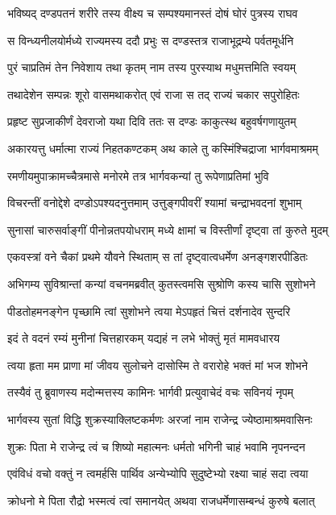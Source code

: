 \twolineshloka
{भविष्यद् दण्डपतनं शरीरे तस्य वीक्ष्य च}
{सम्पश्यमानस्तं दोषं घोरं पुत्रस्य राघव}%

\twolineshloka
{स विन्ध्यनीलयोर्मध्ये राज्यमस्य ददौ प्रभुः}
{स दण्डस्तत्र राजाभूद्रम्ये पर्वतमूर्धनि}%

\twolineshloka
{पुरं चाप्रतिमं तेन निवेशाय तथा कृतम्}
{नाम तस्य पुरस्याथ मधुमत्तमिति स्वयम्}%

\twolineshloka
{तथादेशेन सम्पन्नः शूरो वासमथाकरोत्}
{एवं राजा स तद् राज्यं चकार सपुरोहितः}%

\twolineshloka
{प्रहृष्ट सुप्रजाकीर्णं देवराजो यथा दिवि}
{ततः स दण्डः काकुत्स्थ बहुवर्षगणायुतम्}%

\twolineshloka
{अकारयत्तु धर्मात्मा राज्यं निहतकण्टकम्}
{अथ काले तु कस्मिंश्चिद्राजा भार्गवमाश्रमम्}%

\twolineshloka
{रमणीयमुपाक्रामच्चैत्रमासे मनोरमे}
{तत्र भार्गवकन्यां तु रूपेणाप्रतिमां भुवि}%

\twolineshloka
{विचरन्तीं वनोद्देशे दण्डोऽपश्यदनुत्तमाम्}
{उत्तुङ्गपीवरीं श्यामां चन्द्राभवदनां शुभाम्}%

\twolineshloka
{सुनासां चारुसर्वाङ्गीं पीनोन्नतपयोधराम्}
{मध्ये क्षामां च विस्तीर्णां दृष्ट्वा तां कुरुते मुदम्}%

\twolineshloka
{एकवस्त्रां वने चैकां प्रथमे यौवने स्थिताम्}
{स तां दृष्ट्वात्वधर्मेण अनङ्गशरपीडितः}%

\twolineshloka
{अभिगम्य सुविश्रान्तां कन्यां वचनमब्रवीत्}
{कुतस्त्वमसि सुश्रोणि कस्य चासि सुशोभने}%

\twolineshloka
{पीडतोहमनङ्गेन पृच्छामि त्वां सुशोभने}
{त्वया मेऽपहृतं चित्तं दर्शनादेव सुन्दरि}%

\twolineshloka
{इदं ते वदनं रम्यं मुनीनां चित्तहारकम्}
{यद्यहं न लभे भोक्तुं मृतं मामवधारय}%

\twolineshloka
{त्वया हृता मम प्राणा मां जीवय सुलोचने}
{दासोस्मि ते वरारोहे भक्तं मां भज शोभने}%

\twolineshloka
{तस्यैवं तु ब्रुवाणस्य मदोन्मत्तस्य कामिनः}
{भार्गवी प्रत्युवाचेदं वचः सविनयं नृपम्}%

\twolineshloka
{भार्गवस्य सुतां विद्धि शुक्रस्याक्लिष्टकर्मणः}
{अरजां नाम राजेन्द्र ज्येष्ठामाश्रमवासिनः}%

\twolineshloka
{शुक्रः पिता मे राजेन्द्र त्वं च शिष्यो महात्मनः}
{धर्मतो भगिनी चाहं भवामि नृपनन्दन}%

\twolineshloka
{एवंविधं वचो वक्तुं न त्वमर्हसि पार्थिव}
{अन्येभ्योपि सुदुष्टेभ्यो रक्ष्या चाहं सदा त्वया}%

\twolineshloka
{क्रोधनो मे पिता रौद्रो भस्मत्वं त्वां समानयेत्}
{अथवा राजधर्मेणासम्बन्धं कुरुषे बलात्}%

